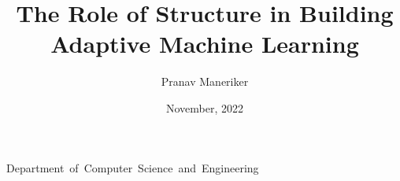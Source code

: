 \documentclass[osudraft]{osudissert96}
\begin{document}
%
%

\author{Pranav Maneriker}
\title{The Role of Structure in Building Adaptive Machine Learning}
\unit{Department of Computer Science and Engineering}


\date{November, 2022}


\maketitle



%
%


\begin{normalsize}

\begin{abstract}
    
\end{abstract}

\tableofcontents
\pagebreak
\listoftables
\pagebreak
\listoffigures
\pagebreak
\end{normalsize}




\begin{normalsize}










%

\end{normalsize}


\begin{footnotesize}
\begin{spacing}{0.6}




\end{spacing}
\end{footnotesize}
\end{document}
